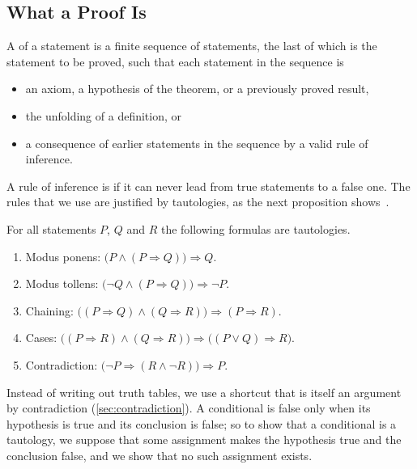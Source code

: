 \subsection{What a Proof Is}

A  of a statement is a finite sequence of statements, the last of which is the statement to be proved, such that each statement in the sequence is
\begin{itemize}
\item an axiom, a hypothesis of the theorem, or a previously proved result,
\item the unfolding of a definition, or
\item a consequence of earlier statements in the sequence by a valid rule of inference.
\end{itemize}
A rule of inference is  if it can never lead from true statements to a false one. The rules that we use are justified by tautologies, as the next proposition shows~\cite{enderton2001}.

\begin{proposition}
\label{prop:inference}
For all statements $P$, $Q$ and $R$ the following formulas are tautologies.
\begin{enumerate}
\item Modus ponens: $\bigl(P\wedge(P\Rightarrow Q)\bigr)\Rightarrow Q$.
\item Modus tollens: $\bigl(\neg Q\wedge(P\Rightarrow Q)\bigr)\Rightarrow\neg P$.
\item Chaining: $\bigl((P\Rightarrow Q)\wedge(Q\Rightarrow R)\bigr)\Rightarrow(P\Rightarrow R)$.
\item Cases: $\bigl((P\Rightarrow R)\wedge(Q\Rightarrow R)\bigr)\Rightarrow\bigl((P\vee Q)\Rightarrow R\bigr)$.
\item Contradiction: $\bigl(\neg P\Rightarrow(R\wedge\neg R)\bigr)\Rightarrow P$.
\end{enumerate}
\end{proposition}

Instead of writing out truth tables, we use a shortcut that is itself an argument by contradiction (\cref{sec:contradiction}). A conditional is false only when its hypothesis is true and its conclusion is false; so to show that a conditional is a tautology, we suppose that some assignment makes the hypothesis true and the conclusion false, and we show that no such assignment exists.

